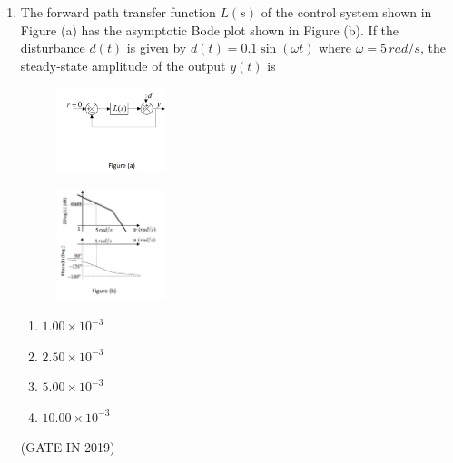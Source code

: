 \documentclass[journal]{IEEEtran}
\begin{document}
\begin{enumerate}
\item The forward path transfer function $L(s)$ of the control system shown in Figure (a) has the asymptotic Bode plot shown in Figure (b). If the disturbance $d(t)$ is given by $d(t) = 0.1 \sin(\omega t)$ where $\omega = 5 \, rad/s$, the steady-state amplitude of the output $y(t)$ is
\begin{multicols}{2}
\begin{figure}[H]
    \includegraphics[width=0.3\textwidth]{9.png}
    \caption{}
    \label{fig:fig9}
\end{figure}
\begin{figure}[H]
    \centering
    \includegraphics[width=0.3\textwidth]{10.png}
    \caption{}
    \label{fig:fig10}
\end{figure}
\end{multicols}
\begin{multicols}{2}
\begin{enumerate}
\item $1.00 \times 10^{-3}$
\item $2.50 \times 10^{-3}$
\item $5.00 \times 10^{-3}$
\item $10.00 \times 10^{-3}$
\end{enumerate}
\end{multicols} \hfill(GATE IN 2019)


\end{enumerate}
\end{document}
